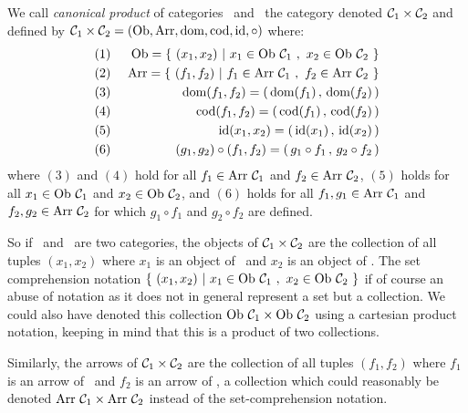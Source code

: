 \begin{defin}\label{Cat:def:canonical:product}
    We call {\em canonical product} of categories \Cone\ and \Ctwo\ the category 
    denoted $\mbox{${\cal C}_{1}$}\times\mbox{${\cal C}_{2}$}$ and defined by $\mbox{${\cal C}_{1}$}\times\mbox{${\cal C}_{2}$}=
    (\mbox{\rm Ob}, \mbox{\rm Arr}, \mbox{\rm dom}, \mbox{\rm cod}, \mbox{\rm id}, \circ)$ where:
        \begin{eqnarray*}
            (1)&\ &\ob=\{\ (x_{1},x_{2})\ |\ x_{1}\in\ob\ \Cone\ 
                                          ,\ x_{2}\in\ob\ \Ctwo\ \}\\
            (2)&\ &\arr=\{\ (f_{1},f_{2})\ |\ f_{1}\in\arr\ \Cone\ 
                                           ,\ f_{2}\in\arr\ \Ctwo\ \}\\
            (3)&\ &\dom(f_{1},f_{2})=(\,\dom(f_{1})\,,\,\dom(f_{2})\,)\\
            (4)&\ &\cod(f_{1},f_{2})=(\,\cod(f_{1})\,,\,\cod(f_{2})\,)\\
            (5)&\ &\id(x_{1},x_{2}) =(\,\id(x_{1})\,,\,\id(x_{2})\,)\\
            (6)&\ &(g_{1},g_{2})\circ(f_{1},f_{2})=(\,g_{1}\circ f_{1}\,
                                                   ,\,g_{2}\circ f_{2}\,)
        \end{eqnarray*}
    where $(3)$ and $(4)$ hold for all $f_{1}\in\mbox{\rm Arr}\ \mbox{${\cal C}_{1}$}$ and $f_{2}
    \in\mbox{\rm Arr}\ \mbox{${\cal C}_{2}$}$, $(5)$ holds for all $x_{1}\in\mbox{\rm Ob}\ \mbox{${\cal C}_{1}$}$ and $x_{2}
    \in\mbox{\rm Ob}\ \mbox{${\cal C}_{2}$}$, and $(6)$ holds for all $f_{1},g_{1}\in\arr\ \Cone$
    and $f_{2},g_{2}\in\arr\ \Ctwo$ for which $g_{1}\circ f_{1}$ and
    $g_{2}\circ f_{2}$ are defined.
\end{defin}

So if \Cone\ and \Ctwo\ are two categories, the objects of $\mbox{${\cal C}_{1}$}\times\mbox{${\cal C}_{2}$}$
are the collection of all tuples $(x_{1}, x_{2})$ where $x_{1}$ is an
object of \Cone\ and $x_{2}$ is an object of \Ctwo. The set comprehension 
notation $\{\ (x_{1},x_{2})\ |\ x_{1}\in\ob\ \Cone\ ,\ x_{2}\in\ob\ \Ctwo\ \}$
if of course an abuse of notation as it does not in general represent a set
but a collection. We could also have denoted this collection 
$\ob\ \Cone\times\ob\ \Ctwo$ using a cartesian product notation, keeping 
in mind that this is a product of two collections.

Similarly, the arrows of $\mbox{${\cal C}_{1}$}\times\mbox{${\cal C}_{2}$}$ are the collection of all tuples
$(f_{1},f_{2})$ where $f_{1}$ is an arrow of \Cone\ and $f_{2}$ is an arrow
of \Ctwo, a collection which could reasonably be denoted $\mbox{\rm Arr}\ \mbox{${\cal C}_{1}$}\times
\mbox{\rm Arr}\ \mbox{${\cal C}_{2}$}$ instead of the set-comprehension notation.

